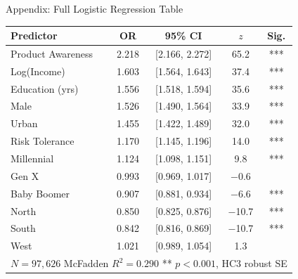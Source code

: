 \documentclass[10pt, aspectratio=169]{beamer}
\begin{document}
\begin{frame}{Appendix: Full Logistic Regression Table}
  \centering
  \small
  \begin{tabular}{lcccc}
    \toprule
    \textbf{Predictor} & \textbf{OR} & \textbf{95\% CI} & $z$ & Sig. \\
    \midrule
    Product Awareness & 2.218 & [2.166, 2.272] & 65.2 & *** \\
    Log(Income)       & 1.603 & [1.564, 1.643] & 37.4 & *** \\
    Education (yrs)   & 1.556 & [1.518, 1.594] & 35.6 & *** \\
    Male              & 1.526 & [1.490, 1.564] & 33.9 & *** \\
    Urban             & 1.455 & [1.422, 1.489] & 32.0 & *** \\
    Risk Tolerance    & 1.170 & [1.145, 1.196] & 14.0 & *** \\
    Millennial        & 1.124 & [1.098, 1.151] &  9.8 & *** \\
    Gen X             & 0.993 & [0.969, 1.017] & $-$0.6 & \\
    Baby Boomer       & 0.907 & [0.881, 0.934] & $-$6.6 & *** \\
    North             & 0.850 & [0.825, 0.876] & $-$10.7 & *** \\
    South             & 0.842 & [0.816, 0.869] & $-$10.7 & *** \\
    West              & 1.021 & [0.989, 1.054] &  1.3 & \\
    \midrule
    \multicolumn{5}{l}{$N = 97{,}626$ \quad McFadden $R^2 = 0.290$ \quad *** $p < 0.001$, HC3 robust SE} \\
    \bottomrule
  \end{tabular}
\end{frame}
\end{document}
